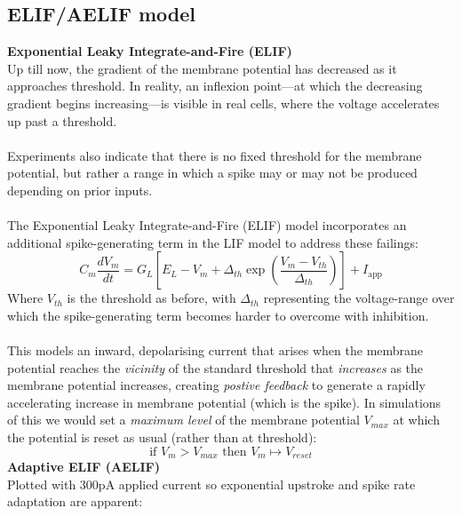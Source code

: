 \documentclass{report}
\begin{document}
\subsection{ELIF/AELIF model}
\textbf{Exponential Leaky Integrate-and-Fire (ELIF)}\\
Up till now, the gradient of the membrane potential has decreased as it approaches threshold. In reality,
an inflexion point---at which the decreasing gradient begins increasing---is visible in real cells, where
the voltage accelerates up past a threshold.\\
\vspace{1mm}\\
Experiments also indicate that there is no fixed threshold for the membrane potential, but rather a range in which
a spike may or may not be produced depending on prior inputs.\\
\vspace{1mm}\\
The Exponential Leaky Integrate-and-Fire (ELIF) model incorporates an additional spike-generating term in the 
LIF model to address these failings:
\begin{equation*}
C_m\frac{dV_m}{dt}=G_L\left[E_L-V_m+\Delta_{th}\exp\left(\frac{V_m-V_{th}}{\Delta_{th}}\right)\right]+I_{\text{app}}
\end{equation*}
Where $V_{th}$ is the threshold as before, with $\Delta_{th}$ representing the voltage-range over which the
spike-generating term becomes harder to overcome with inhibition.\\
\vspace{1mm}\\
This models an inward, depolarising current that arises when the membrane potential reaches the \textit{vicinity} 
of the standard threshold that \textit{increases} as the membrane potential increases, creating 
\textit{postive feedback} to generate a rapidly accelerating increase in membrane potential (which is the spike).
In simulations of this we would set a \textit{maximum level} of the membrane potential $V_{max}$ at which the
potential is reset as usual (rather than at threshold):
\begin{equation*}
\text{if }V_m>V_{max}\text{ then }V_m\mapsto V_{reset}
\end{equation*}
\newpage
\noindent\textbf{Adaptive ELIF (AELIF)}\\
Plotted with 300pA applied current so exponential upstroke and spike rate adaptation are apparent:
\end{document}
